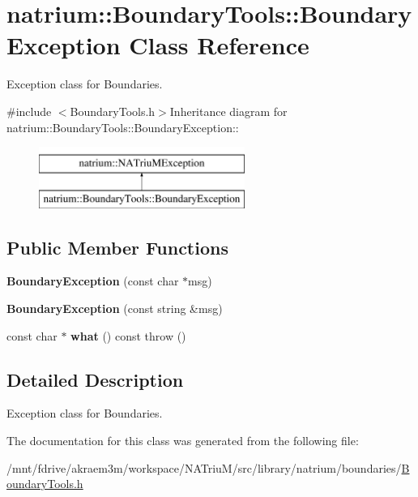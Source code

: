\hypertarget{classnatrium_1_1BoundaryTools_1_1BoundaryException}{
\section{natrium::BoundaryTools::BoundaryException Class Reference}
\label{classnatrium_1_1BoundaryTools_1_1BoundaryException}
}


Exception class for Boundaries.  


{\ttfamily \#include $<$BoundaryTools.h$>$}Inheritance diagram for natrium::BoundaryTools::BoundaryException::\begin{figure}[H]
\begin{center}
\leavevmode
\includegraphics[height=2cm]{classnatrium_1_1BoundaryTools_1_1BoundaryException}
\end{center}
\end{figure}
\subsection*{Public Member Functions}
\begin{DoxyCompactItemize}
\item 
\hypertarget{classnatrium_1_1BoundaryTools_1_1BoundaryException_a9685153821678e1c219cd9c51492081a}{
{\bfseries BoundaryException} (const char $\ast$msg)}
\label{classnatrium_1_1BoundaryTools_1_1BoundaryException_a9685153821678e1c219cd9c51492081a}

\item 
\hypertarget{classnatrium_1_1BoundaryTools_1_1BoundaryException_af0004b850fab0736371aa9fdb6ff159b}{
{\bfseries BoundaryException} (const string \&msg)}
\label{classnatrium_1_1BoundaryTools_1_1BoundaryException_af0004b850fab0736371aa9fdb6ff159b}

\item 
\hypertarget{classnatrium_1_1BoundaryTools_1_1BoundaryException_ad5df14f0c881b7458db4ac3a553699bc}{
const char $\ast$ {\bfseries what} () const   throw ()}
\label{classnatrium_1_1BoundaryTools_1_1BoundaryException_ad5df14f0c881b7458db4ac3a553699bc}

\end{DoxyCompactItemize}


\subsection{Detailed Description}
Exception class for Boundaries. 

The documentation for this class was generated from the following file:\begin{DoxyCompactItemize}
\item 
/mnt/fdrive/akraem3m/workspace/NATriuM/src/library/natrium/boundaries/\hyperlink{BoundaryTools_8h}{BoundaryTools.h}\end{DoxyCompactItemize}
